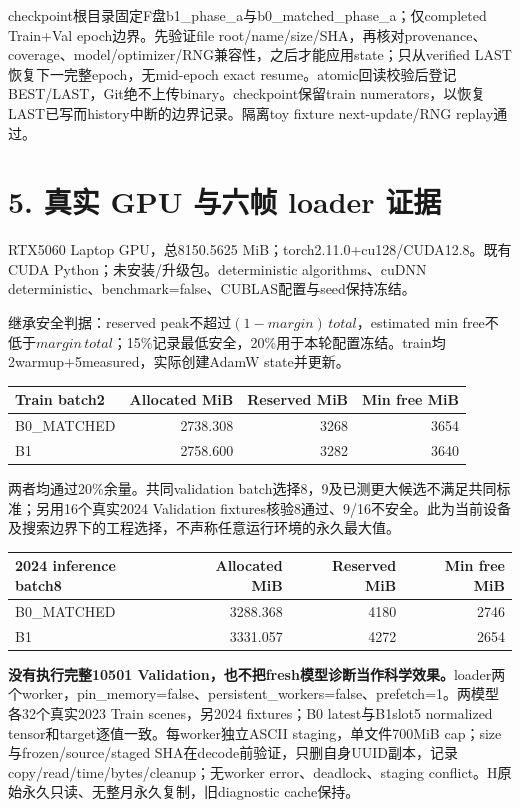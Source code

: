 \documentclass[10pt,a4paper,fontset=windows]{ctexart}
\begin{document}
checkpoint根目录固定F盘b1\_phase\_a与b0\_matched\_phase\_a；仅completed Train+Val epoch边界。先验证file root/name/size/SHA，再核对provenance、coverage、model/optimizer/RNG兼容性，之后才能应用state；只从verified LAST恢复下一完整epoch，无mid-epoch exact resume。atomic回读校验后登记BEST/LAST，Git绝不上传binary。checkpoint保留train numerators，以恢复LAST已写而history中断的边界记录。隔离toy fixture next-update/RNG replay通过。
\newpage
\section*{5. 真实 GPU 与六帧 loader 证据}
RTX5060 Laptop GPU，总8150.5625 MiB；torch2.11.0+cu128/CUDA12.8。既有CUDA Python；未安装/升级包。deterministic algorithms、cuDNN deterministic、benchmark=false、CUBLAS配置与seed保持冻结。

继承安全判据：reserved peak不超过$(1-margin)\,total$，estimated min free不低于$margin\,total$；15\%记录最低安全，20\%用于本轮配置冻结。train均2warmup+5measured，实际创建AdamW state并更新。
\begin{center}\begin{tabular}{lrrr}\toprule
Train batch2 & Allocated MiB & Reserved MiB & Min free MiB\\\midrule
B0\_MATCHED & 2738.308 & 3268 & 3654 \\
B1 & 2758.600 & 3282 & 3640 \\
\bottomrule\end{tabular}\end{center}
两者均通过20\%余量。共同validation batch选择8，9及已测更大候选不满足共同标准；另用16个真实2024 Validation fixtures核验8通过、9/16不安全。此为当前设备及搜索边界下的工程选择，不声称任意运行环境的永久最大值。
\begin{center}\begin{tabular}{lrrr}\toprule
2024 inference batch8 & Allocated MiB & Reserved MiB & Min free MiB\\\midrule
B0\_MATCHED & 3288.368 & 4180 & 2746 \\
B1 & 3331.057 & 4272 & 2654 \\
\bottomrule\end{tabular}\end{center}
\textbf{没有执行完整10501 Validation，也不把fresh模型诊断当作科学效果。}loader两个worker，pin\_memory=false、persistent\_workers=false、prefetch=1。两模型各32个真实2023 Train scenes，另2024 fixtures；B0 latest与B1slot5 normalized tensor和target逐值一致。每worker独立ASCII staging，单文件700MiB cap；size与frozen/source/staged SHA在decode前验证，只删自身UUID副本，记录copy/read/time/bytes/cleanup；无worker error、deadlock、staging conflict。H原始永久只读、无整月永久复制，旧diagnostic cache保持。
\end{document}
